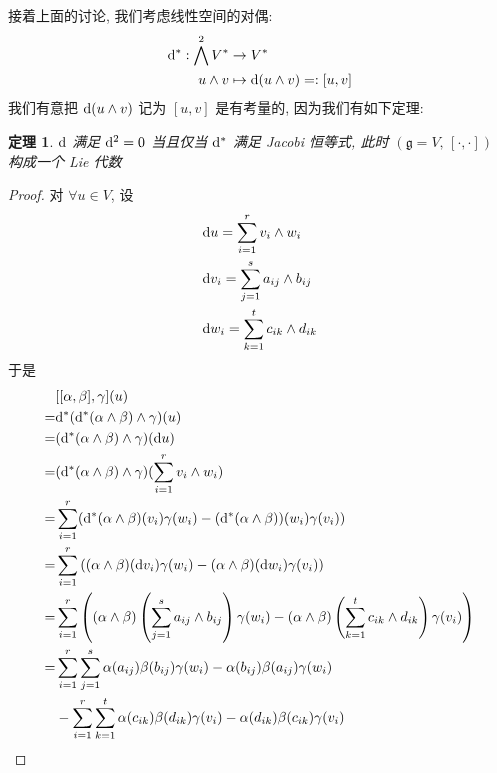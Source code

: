 \documentclass{book}
\newtheorem{theorem}{\indent 定理}[section]
\newcommand{\md}{{\rm d}}
\begin{document}
        接着上面的讨论, 我们考虑线性空间的对偶:
        \begin{align*}
            \md^*:\bigwedge^2V^*&\rightarrow V^*\\
            u\wedge v&\mapsto \md(u\wedge v)=:[u,v]
        \end{align*}
        我们有意把 $\md(u\wedge v)$ 记为 $[u,v]$ 是有考量的, 因为我们有如下定理:
        \begin{theorem}\label{lie}
            $\md$ 满足 $\md^2 = 0$ 当且仅当 $\md^*$ 满足 {\rm Jacobi} 恒等式, 此时 $(\mathfrak{g} = V,\,[\cdot,\cdot])$ 构成一个 {\rm Lie} 代数
        \end{theorem}
        \begin{proof}
            对 $\forall u\in V$, 设 
            \begin{align*}
                &\md u=\sum\limits_{i=1}^{r}v_i\wedge w_i \\
                &\md v_i=\sum\limits_{j=1}^{s}a_{ij}\wedge b_{ij} \\
                &\md w_i=\sum\limits_{k=1}^{t}c_{ik}\wedge d_{ik}
            \end{align*}
            于是
            \begin{align*}
                &[[\alpha,\beta],\gamma](u) \\
                =&\md^*(\md^*(\alpha\wedge\beta)\wedge\gamma)(u) \\
                =&(\md^*(\alpha\wedge\beta)\wedge\gamma)(\md u) \\
                =&(\md^*(\alpha\wedge\beta)\wedge\gamma)(\sum_{i=1}^{r}v_i\wedge w_i) \\
                =&\sum_{i=1}^{r}(\md^*(\alpha\wedge\beta)(v_i)\gamma(w_i)-(\md^*(\alpha\wedge\beta))(w_i)\gamma(v_i)) \\
                =&\sum_{i=1}^{r}\left((\alpha\wedge\beta)(\md v_i)\gamma(w_i)-(\alpha\wedge\beta)(\md w_i)\gamma(v_i)\right) \\
                =&\sum_{i=1}^{r}\left((\alpha\wedge\beta)\left(\sum_{j=1}^{s}a_{ij}\wedge b_{ij}\right)\gamma(w_i)-(\alpha\wedge\beta)\left(\sum_{k=1}^{t}c_{ik}\wedge d_{ik}\right)\gamma(v_i)\right) \\
                =&\sum_{i=1}^{r}\sum_{j=1}^{s}\alpha(a_{ij})\beta(b_{ij})\gamma(w_i)-\alpha(b_{ij})\beta(a_{ij})\gamma(w_i) \\
                &-\sum_{i=1}^{r}\sum_{k=1}^{t}\alpha(c_{ik})\beta(d_{ik})\gamma(v_i)-\alpha(d_{ik})\beta(c_{ik})\gamma(v_i) \\

\end{align*}
\end{proof}
\end{document}
